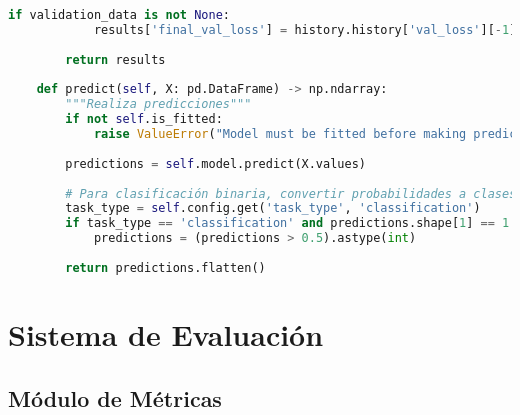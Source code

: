 \begin{lstlisting}[language=Python, caption=Implementación de red neuronal con TensorFlow]
        if validation_data is not None:
            results['final_val_loss'] = history.history['val_loss'][-1]
        
        return results
    
    def predict(self, X: pd.DataFrame) -> np.ndarray:
        """Realiza predicciones"""
        if not self.is_fitted:
            raise ValueError("Model must be fitted before making predictions")
        
        predictions = self.model.predict(X.values)
        
        # Para clasificación binaria, convertir probabilidades a clases
        task_type = self.config.get('task_type', 'classification')
        if task_type == 'classification' and predictions.shape[1] == 1:
            predictions = (predictions > 0.5).astype(int)
        
        return predictions.flatten()
\end{lstlisting}

\section{Sistema de Evaluación}

\subsection{Módulo de Métricas}

